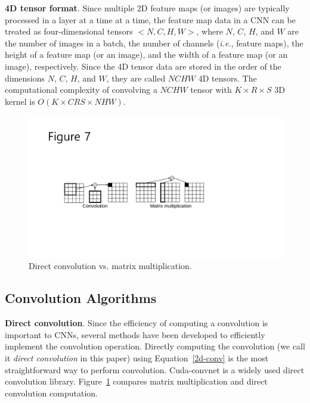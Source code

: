 {\bf 4D tensor format}. Since multiple 2D feature maps (or images) are typically processed in a layer at a time at a time, the feature map data in a CNN can be treated as four-dimensional tensors $<N, C, H, W>$, where $N$, $C$, $H$, and $W$ are the number of images in a batch, the number of channels (\textit{i.e.}, feature maps), the height of a feature map (or an image), and the width of a feature map (or an image), respectively. Since the 4D tensor data are stored in the order of the dimensions $N$, $C$, $H$, and $W$, they are called $NCHW$ 4D tensors. The computational complexity of convolving a $NCHW$ tensor with $K \times R \times S$ 3D kernel is $O(K \times CRS \times NHW)$.

\begin{figure}[htbp]
  \centering
  \includegraphics[width=0.9\linewidth]{./figures/direct}
  \caption{Direct convolution vs. matrix multiplication.}
  \label{fig_direct}
\end{figure}

\subsection{Convolution Algorithms}
\label{sec:algorithms}
{\bf Direct convolution}. Since the efficiency of computing a convolution is important to CNNs, several methods have been developed to efficiently implement the convolution operation. Directly computing the convolution (we call it \textit{direct convolution} in this paper) using Equation~\ref{2d-conv} is the most straightforward way to perform convolution. Cuda-convnet\cite{cuda-convnet} is a widely used direct convolution library. Figure~\ref{fig_direct} compares matrix multiplication and direct convolution computation.

